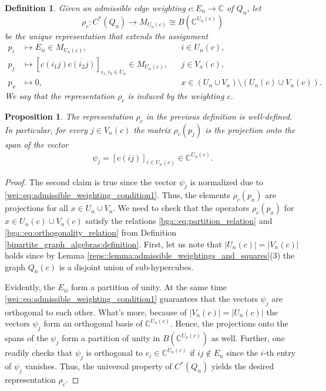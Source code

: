 \documentclass[a4paper]{amsart}
\newcommand{\C}{\mathbb{C}}
\newtheorem{definition}[thm]{Definition}
\newtheorem{proposition}[thm]{Proposition}
\begin{document}
\begin{definition}
    \label{reps::def:representation_rho_c_induced_by_weighting}
    Given an admissible edge weighting $c: E_n \to \C$ of $Q_n$, let 
    $$
    \rho_c: C^\ast(Q_n) \to M_{U_n(c)} \cong B(\C^{U_n(c)})
    $$
    be the unique representation that extends the assignment
    \begin{align*}
        p_i &\mapsto E_{ii} \in M_{U_n(c)}, && i \in U_n(c), \\
        p_j &\mapsto \left[ c(i_1j) \overline{c(i_2j)} \right]_{i_1, i_2 \in U_n} \in M_{U_n(c)}, && j \in V_n(c), \\
        p_x &\mapsto 0, && x \in (U_n \cup V_n) \setminus (U_n(c) \cup V_n(c)).
    \end{align*}
    We say that the representation $\rho_c$ is induced by the weighting $c$. 
\end{definition}

\begin{proposition}
    \label{reps::prop:admissible_weighting_induces_representation}
    The representation $\rho_c$ in the previous definition is well-defined.
    In particular, for every $j \in V_n(c)$ the matrix $\rho_c(p_j)$ is the projection onto the span of the vector
    \begin{align*}
        \psi_j = \left[ c(ij) \right]_{i \in U_n(c)} \in \C^{U_n(c)}.
    \end{align*}
\end{proposition}

\begin{proof}
    The second claim is true since the vector $\psi_j$ is normalized due to \eqref{wei::eq:admissible_weighting_condition1}. Thus, the elements $\rho_c(p_x)$ are projections for all $x \in U_n \cup V_n$.
    We need to check that the operators $\rho_c(p_x)$ for $x \in U_n(c) \cup V_n(c)$ satisfy the relations \eqref{bga::eq:partition_relation} and \eqref{bga::eq:orthogonality_relation} from Definition \ref{bipartite_graph_algebras:definition}. First, let us note that $|U_n(c)| = |V_n(c)|$ holds since by Lemma \ref{reps::lemma:admissible_weightings_and_squares}(3) the graph $Q_n(c)$ is a disjoint union of sub-hypercubes.

    Evidently, the $E_{ii}$ form a partition of unity. At the same time \eqref{wei::eq:admissible_weighting_condition1} guarantees that the vectors $\psi_j$ are orthogonal to each other.  What's more, because of $|V_n(c)| = |U_n(c)|$ the vectors $\psi_j$ form an orthogonal basis of $\C^{U_n(c)}$. Hence, the projections onto the spans of the $\psi_j$ form a partition of unity in $B(\C^{U_n(c)})$ as well. Further, one readily checks that $\psi_j$ is orthogonal to $e_i \in \C^{U_n(c)}$ if $ij \not \in E_n$ since the $i$-th entry of $\psi_j$ vanishes. Thus, the universal property of $C^\ast(Q_n)$ yields the desired representation $\rho_c$.
\end{proof}
\end{document}
